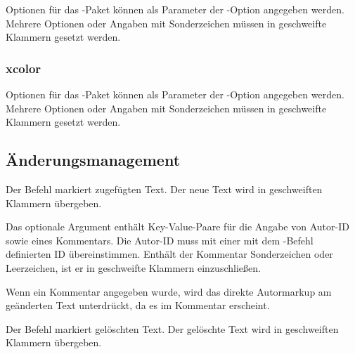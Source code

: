 
Optionen für das -Paket können als Parameter der -Option angegeben werden.
Mehrere Optionen oder Angaben mit Sonderzeichen müssen in geschweifte Klammern gesetzt werden.




\subsubsection{xcolor}


Optionen für das -Paket können als Parameter der -Option angegeben werden.
Mehrere Optionen oder Angaben mit Sonderzeichen müssen in geschweifte Klammern gesetzt werden.




\subsection{Änderungsmanagement}
\label{sec:ui:changemanagement}

\localtableofcontents



Der Befehl  markiert zugefügten Text.
Der neue Text wird in geschweiften Klammern übergeben.

Das optionale Argument enthält Key-Value-Paare für die Angabe von Autor-ID sowie eines Kommentars.
Die Autor-ID muss mit einer mit dem -Befehl definierten ID übereinstimmen.
Enthält der Kommentar Sonderzeichen oder Leerzeichen, ist er in geschweifte Klammern einzuschließen.

Wenn ein Kommentar angegeben wurde, wird das direkte Autormarkup am geänderten Text unterdrückt, da es im Kommentar erscheint.





Der Befehl  markiert gelöschten Text.
Der gelöschte Text wird in geschweiften Klammern übergeben.

